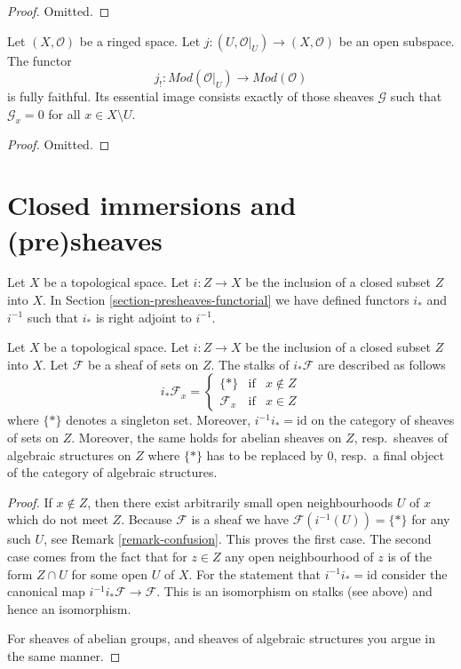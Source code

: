 \begin{proof}
Omitted.
\end{proof}


\begin{lemma}
\label{lemma-equivalence-categories-open-modules}
Let $(X, \mathcal{O})$ be a ringed space.
Let $j : (U, \mathcal{O}|_U) \to (X, \mathcal{O})$
be an open subspace.
The functor
$$
j_! : \textit{Mod}(\mathcal{O}|_U) \longrightarrow \textit{Mod}(\mathcal{O})
$$
is fully faithful. Its essential image consists exactly
of those sheaves $\mathcal{G}$ such that
$\mathcal{G}_x = 0$ for all $x \in X \setminus U$.
\end{lemma}

\begin{proof}
Omitted.
\end{proof}


\section{Closed immersions and (pre)sheaves}
\label{section-closed-immersions}

\noindent
Let $X$ be a topological space.
Let $i : Z \to X$ be the inclusion of a closed subset $Z$ into $X$.
In Section \ref{section-presheaves-functorial} we have defined
functors $i_*$ and $i^{-1}$ such that $i_*$ is right adjoint to
$i^{-1}$.

\begin{lemma}
\label{lemma-stalks-closed-pushforward}
Let $X$ be a topological space.
Let $i : Z \to X$ be the inclusion of a closed subset $Z$ into $X$.
Let $\mathcal{F}$ be a sheaf of sets on $Z$.
The stalks of $i_*\mathcal{F}$ are described as follows
$$
i_*\mathcal{F}_x =
\left\{
\begin{matrix}
\{*\} & \text{if} & x \not \in Z \\
\mathcal{F}_x & \text{if} & x \in Z 
\end{matrix}
\right.
$$
where $\{*\}$ denotes a singleton set. Moreover,
$i^{-1}i_* = \text{id}$ on the category of sheaves
of sets on $Z$. Moreover, the same holds for abelian
sheaves on $Z$, resp.\ sheaves of algebraic structures on $Z$
where $\{*\}$ has to be replaced by $0$, resp.\ a
final object of the category of algebraic structures.
\end{lemma}

\begin{proof}
If $x \not \in Z$, then there exist arbitrarily small open
neighbourhoods $U$ of $x$ which do not meet $Z$.
Because $\mathcal{F}$ is a sheaf
we have $\mathcal{F}(i^{-1}(U)) = \{*\}$ for any such $U$,
see Remark \ref{remark-confusion}. This proves the first case.
The second case comes from the fact that for $z \in Z$
any open neighbourhood of $z$ is of the form $Z \cap U$ for
some open $U$ of $X$. For the statement that
$i^{-1}i_* = \text{id}$ consider the canonical map
$i^{-1}i_*\mathcal{F} \to \mathcal{F}$. This is an isomorphism
on stalks (see above) and hence an isomorphism.

\medskip\noindent
For sheaves of abelian groups, and sheaves of algebraic structures
you argue in the same manner.
\end{proof}


